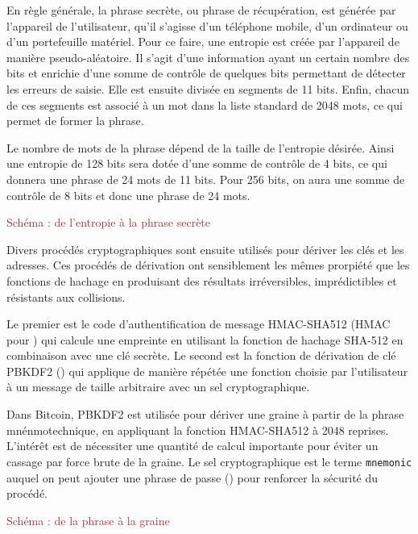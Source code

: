 
En règle générale, la phrase secrète, ou phrase de récupération, est générée par l'appareil de l'utilisateur, qu'il s'agisse d'un téléphone mobile, d'un ordinateur ou d'un portefeuille matériel. Pour ce faire, une entropie est créée par l'appareil de manière pseudo-aléatoire. Il s'agit d'une information ayant un certain nombre des bits et enrichie d'une somme de contrôle de quelques bits permettant de détecter les erreurs de saisie. Elle est ensuite divisée en segments de 11 bits. Enfin, chacun de ces segments est associé à un mot dans la liste standard de 2048 mots, ce qui permet de former la phrase. %

Le nombre de mots de la phrase dépend de la taille de l'entropie désirée. Ainsi une entropie de 128 bits sera dotée d'une somme de contrôle de 4 bits, ce qui donnera une phrase de 24 mots de 11 bits. Pour 256 bits, on aura une somme de contrôle de 8 bits et donc une phrase de 24 mots.

\textcolor{brown}{Schéma : de l'entropie à la phrase secrète}


Divers procédés cryptographiques sont ensuite utilisés pour dériver les clés et les adresses. Ces procédés de dérivation ont sensiblement les mêmes prorpiété que les fonctions de hachage en produisant des résultats irréversibles, imprédictibles et résistants aux collisions.

Le premier est le code d'authentification de message HMAC-SHA512 (HMAC pour ) qui calcule une empreinte en utilisant la fonction de hachage SHA-512 en combinaison avec une clé secrète. Le second est la fonction de dérivation de clé PBKDF2 () qui applique de manière répétée une fonction choisie par l'utilisateur à un message de taille arbitraire avec un sel cryptographique. 

Dans Bitcoin, PBKDF2 est utilisée pour dériver une graine à partir de la phrase mnénmotechnique, en appliquant la fonction HMAC-SHA512 à 2048 reprises. L'intérêt est de nécessiter une quantité de calcul importante pour éviter un cassage par force brute de la graine. Le sel cryptographique est le terme \verb?mnemonic? auquel on peut ajouter une phrase de passe () pour renforcer la sécurité du procédé.

\textcolor{brown}{Schéma : de la phrase à la graine}

